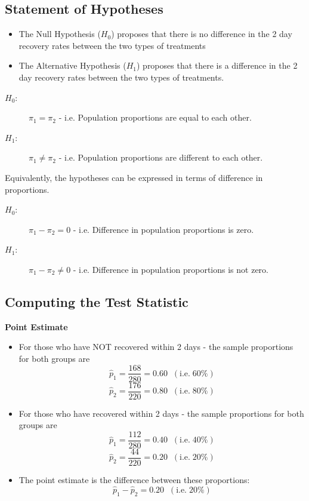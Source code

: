 \documentclass[a4paper,12pt]{article}
\begin{document}
\subsection*{Statement of Hypotheses}


\begin{itemize}
    \item The Null Hypothesis ($H_0$) proposes that there is no difference in the 2 day recovery rates between the two types of treatments
    \item The Alternative Hypothesis ($H_1$) proposes that there is a difference in the 2 day recovery rates between the two types of treatments.
\end{itemize}
\begin{description}
\item[$H_0$:] $\pi_1 = \pi_2$  - i.e. Population proportions are equal to each other.
\item[$H_1$:] $\pi_1 \neq \pi_2$ - i.e. Population proportions are different to each other.
\end{description}

\noindent Equivalently, the hypotheses can be expressed in terms of difference in proportions.
\begin{description}
\item[$H_0$:] $\pi_1 - \pi_2 = 0$ - i.e. Difference in population proportions is zero.
\item[$H_1$:] $\pi_1 - \pi_2 \neq 0$ - i.e. Difference in population proportions is not zero.
\end{description}

\newpage
\subsection*{Computing the Test Statistic}

\noindent \textbf{Point Estimate}

\begin{itemize}
     \item For those who have NOT recovered within 2 days - the sample proportions for both groups are
    \[ \hat{p}_1 = \frac{168}{280} = 0.60 \;\;(\mbox{i.e.}\; 60\%) \] 
    \[ \hat{p}_2 = \frac{176}{220} = 0.80 \;\;(\mbox{i.e.}\; 80\%) \]  
    \item For those who have recovered within 2 days - the sample proportions for both groups are
    \[ \hat{p}_1 = \frac{112}{280} = 0.40 \;\;(\mbox{i.e.}\; 40\%) \] 
    \[ \hat{p}_2 = \frac{44}{220} = 0.20 \;\;(\mbox{i.e.}\; 20\%) \]  
    \item The point estimate is the difference between these proportions:
    \[ \hat{p}_1  - \hat{p}_2  = 0.20 \;\;(\mbox{i.e.}\; 20\%) \]
\end{itemize}
\end{document}
